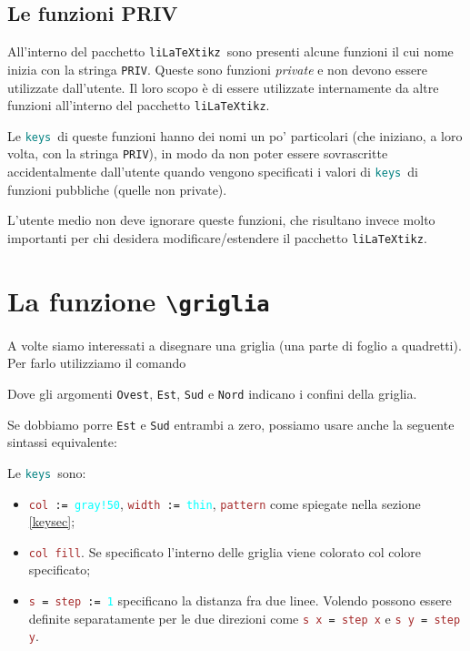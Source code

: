 \documentclass[italian, a4paper]{article}
\newcommand{\bs}{\textbackslash}
\newcommand{\ttt}[1]{\texttt{#1}}
\newcommand{\liLaTeXtikz}{\ttt{liLaTeXtikz}}
\newcommand{\comandons}[2][\large]{\vspace*{1mm}\noindent\fbox{\parbox{\textwidth}{#1\ttt{#2}}}}
\newcommand{\comando}[2][\large]{\comandons[#1]{#2}\vspace*{3mm}}
\newcommand{\blue}[1]{\textcolor{blue}{#1}}
\newcommand{\cyan}[1]{\textcolor{cyan}{#1}}
\newcommand{\keys}{\textcolor{teal}{\ttt{keys}}}
\newcommand{\key}[1]{\textcolor{brown}{\ttt{#1}}}
\newcommand{\keyval}[1]{\cyan{\ttt{#1}}}
\begin{document}
\subsection{Le funzioni PRIV}\label{PRIVsec}
All'interno del pacchetto \liLaTeXtikz\ sono presenti alcune funzioni il cui nome inizia con la stringa \ttt{PRIV}. Queste sono funzioni \textit{private} e non devono essere utilizzate dall'utente. Il loro scopo è di essere utilizzate internamente da altre funzioni all'interno del pacchetto \liLaTeXtikz.

Le \keys\ di queste funzioni hanno dei nomi un po' particolari (che iniziano, a loro volta, con la stringa \ttt{PRIV}), in modo da non poter essere sovrascritte accidentalmente dall'utente quando vengono specificati i valori di \keys\ di funzioni pubbliche (quelle non private).

L'utente medio non deve ignorare queste funzioni, che risultano invece molto importanti per chi desidera modificare/estendere il pacchetto \liLaTeXtikz.

\newpage
\section{La funzione \ttt{\bs griglia}}
A volte siamo interessati a disegnare una griglia (una parte di foglio a quadretti). Per farlo utilizziamo il comando

\comandons{\bs griglia[\keys]\{\blue{Ovest}\}\{\blue{Est}\}\{\blue{Sud}\}\{\blue{Nord}\};}
Dove gli argomenti \ttt{Ovest}, \ttt{Est}, \ttt{Sud} e \ttt{Nord} indicano i confini della griglia.

Se dobbiamo porre \ttt{Est} e \ttt{Sud} entrambi a zero, possiamo usare anche la seguente sintassi equivalente:

\comando{\bs grigliaO[\keys]\{\blue{Est}\}\{\blue{Nord}\};}

Le \keys\ sono:
\begin{itemize}[nolistsep]
\item \ttt{\key{col} := \keyval{gray!50}}, \ttt{\key{width} := \keyval{thin}}, \key{pattern} come spiegate nella sezione \ref{keysec};
\item \key{col fill}. Se specificato l'interno delle griglia viene colorato col colore specificato;
\item \ttt{\key{s} = \key{step} := \keyval{1}} specificano la distanza fra due linee. Volendo possono essere definite separatamente per le due direzioni come \ttt{\key{s x} = \key{step x}} e \ttt{\key{s y} = \key{step y}}.
\end{itemize}
\end{document}
